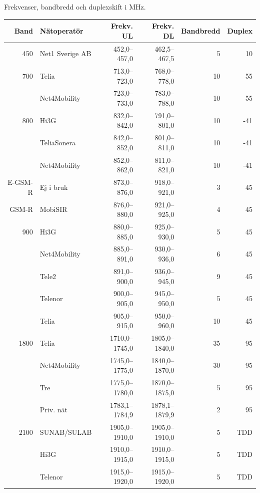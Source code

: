 Frekvenser, bandbredd och duplexskift i MHz.

\begin{longtable}{rlrrrr}
	    \bf Band & \bf Nätoperatör    & \bf Frekv. UL & \bf Frekv. DL & \bf Bandbredd & \bf Duplex \\ \hline
	    \endhead

450     & Net1 Sverige AB & 452,0--457,0   & 462,5--467,5   & 5   & 10  \\ \hline
700     & Telia           & 713,0--723,0   & 768,0--778,0   & 10  & 55  \\
        & Net4Mobility    & 723,0--733,0   & 783,0--788,0   & 10  & 55  \\ \hline
800     & Hi3G            & 832,0--842,0   & 791,0--801,0   & 10  & -41 \\
        & TeliaSonera     & 842,0--852,0   & 801,0--811,0   & 10  & -41 \\
        & Net4Mobility    & 852,0--862,0   & 811,0--821,0   & 10  & -41 \\ \hline
E-GSM-R & Ej i bruk       & 873,0--876,0   & 918,0--921,0   & 3   & 45  \\
GSM-R   & MobiSIR         & 876,0--880,0   & 921,0--925,0   & 4   & 45  \\ \hline
900     & Hi3G            & 880,0--885,0   & 925,0--930,0   & 5   & 45  \\
        & Net4Mobility    & 885,0--891,0   & 930,0--936,0   & 6   & 45  \\
        & Tele2           & 891,0--900,0   & 936,0--945,0   & 9   & 45  \\
        & Telenor         & 900,0--905,0   & 945,0--950,0   & 5   & 45  \\
        & Telia           & 905,0--915,0   & 950,0--960,0   & 10  & 45  \\ \hline
1800    & Telia           & 1710,0--1745,0 & 1805,0--1840,0 & 35  & 95  \\
        & Net4Mobility    & 1745,0--1775,0 & 1840,0--1870,0 & 30  & 95  \\
        & Tre             & 1775,0--1780,0 & 1870,0--1875,0 & 5   & 95  \\
        & Priv. nät       & 1783,1--1784,9 & 1878,1--1879,9 & 2   & 95  \\ \hline
2100    & SUNAB/SULAB     & 1905,0--1910,0 & 1905,0--1910,0 & 5   & TDD \\
        & Hi3G            & 1910,0--1915,0 & 1910,0--1915,0 & 5   & TDD \\
        & Telenor         & 1915,0--1920,0 & 1915,0--1920,0 & 5   & TDD \\

\end{longtable}
